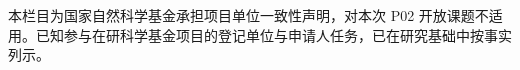 \justifying
\NSFCBodyText

本栏目为国家自然科学基金承担项目单位一致性声明，对本次 P02 开放课题不适用。已知参与在研科学基金项目的登记单位与申请人任务，已在研究基础中按事实列示。
